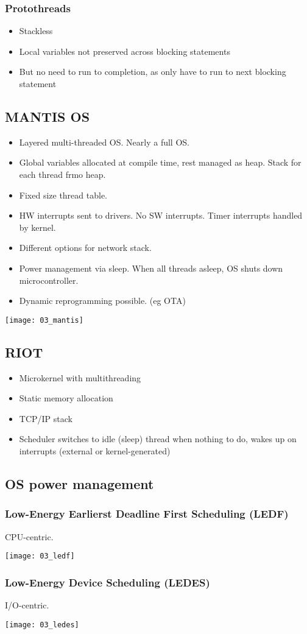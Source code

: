 \subsubsection{Protothreads}

\begin{itemize}
		\item Stackless
		\item Local variables not preserved across blocking statements
		\item But no need to run to completion, as only have to run to next blocking statement
\end{itemize}

\subsection{MANTIS OS}

\begin{itemize}
		\item Layered multi-threaded OS. Nearly a full OS.
		\item Global variables allocated at compile time, rest managed as heap. Stack for each thread frmo heap.
		\item Fixed size thread table.
		\item HW interrupts sent to drivers. No SW interrupts. Timer interrupts handled by kernel.
		\item Different options for network stack.
		\item Power management via sleep. When all threads asleep, OS shuts down microcontroller.
		\item Dynamic reprogramming possible. (eg OTA)
\end{itemize}

\texttt{[image: 03\_mantis]}

\subsection{RIOT}

\begin{itemize}
		\item Microkernel with multithreading
		\item Static memory allocation
		\item TCP/IP stack
		\item Scheduler switches to idle (sleep) thread when nothing to do,
				wakes up on interrupts (external or kernel-generated)
\end{itemize}

\subsection{OS power management}

\subsubsection{Low-Energy Earlierst Deadline First Scheduling (LEDF)}

CPU-centric.

\texttt{[image: 03\_ledf]}

\subsubsection{Low-Energy Device Scheduling (LEDES)}

I/O-centric.

\texttt{[image: 03\_ledes]}
